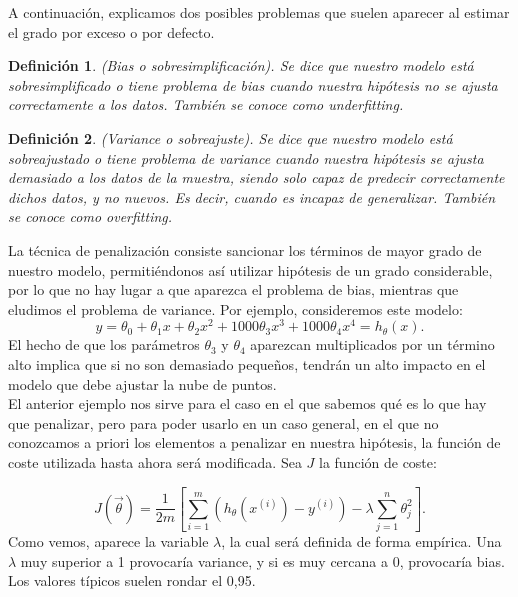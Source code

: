 \documentclass[a4paper,11pt]{article}
\newtheorem{definition}{Definición}
\begin{document}
\noindent
A continuación, explicamos dos posibles problemas que suelen aparecer al estimar el grado por exceso o por defecto.\\
\begin{definition}(Bias o sobresimplificación). Se dice que nuestro modelo está
sobresimplificado o tiene problema de bias cuando nuestra hipótesis no se ajusta
correctamente a los datos. También se conoce como \textit{underfitting}.

\end{definition}
\begin{definition}(Variance o sobreajuste). Se dice que nuestro modelo está sobreajustado o tiene problema de variance cuando nuestra hipótesis se ajusta demasiado a los datos de la muestra, siendo solo capaz de predecir correctamente
dichos datos, y no nuevos. Es decir, cuando es incapaz de generalizar. También
se conoce como \textit{overfitting}.


\end{definition}
La técnica de penalización consiste sancionar los términos de mayor grado de nuestro modelo, permitiéndonos así utilizar hipótesis de un grado considerable, por lo que no hay lugar a que aparezca el problema de bias, mientras que eludimos el problema de variance. Por ejemplo, consideremos este modelo:
\begin{equation}
 y=\theta_0+\theta_1 x+\theta_2 x^2+1000\theta_3 x^3+1000\theta_4 x^4 = h_\theta (x).
\end{equation}
El hecho de que los parámetros $\theta_3$ y $\theta_4$ aparezcan multiplicados por un término
alto implica que si no son demasiado pequeños, tendrán un alto impacto en el
modelo que debe ajustar la nube de puntos.\\

\noindent
El anterior ejemplo nos sirve para el caso en el que sabemos qué es lo que hay que penalizar, pero para poder usarlo en un caso general, en el que no conozcamos a priori los elementos a penalizar en nuestra hipótesis, la función de coste utilizada hasta ahora será modificada. Sea $J$ la función de coste:

\begin{equation}
J(\vec{\theta})=\frac{1}{2m}\left[\sum_{i=1}^{m} \left(h_\theta (x^{(i)})-y^{(i)}\right)-\lambda \sum_{j=1}^{n}\theta_{j}^2\right].
\end{equation}
Como vemos, aparece la variable $\lambda$, la cual será definida de forma empírica. Una $\lambda$ muy superior a 1 provocaría variance, y si es muy cercana a 0, provocaría bias. Los valores típicos suelen rondar el 0,95.\\
\end{document}
